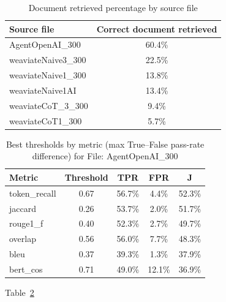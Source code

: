 \begin{table}[htbp]
    \centering
    \begin{tabular}{l c}
        \hline
        Source file & Correct document retrieved \\
        \hline
    AgentOpenAI\_300 & 60.4\% \\
    weaviateNaive3\_300 & 22.5\% \\
    weaviateNaive1\_300 & 13.8\% \\
    weaviateNaive1AI & 13.4\% \\
    weaviateCoT\_3\_300 & 9.4\% \\
    weaviateCoT1\_300 & 5.7\% \\
        \hline
    \end{tabular}
    \caption{Document retrieved percentage by source file}\label{tab:doc-retrieved-by-source}
\end{table}

\begin{table}[htbp]
  \centering
  \begin{tabular}{l c c c c}
    \hline
    Metric & Threshold & TPR & FPR & J \\
    \hline
    token\_recall & 0.67 & 56.7\% & 4.4\%  & 52.3\% \\
    jaccard       & 0.26 & 53.7\% & 2.0\%  & 51.7\% \\
    rouge1\_f     & 0.40 & 52.3\% & 2.7\%  & 49.7\% \\
    overlap       & 0.56 & 56.0\% & 7.7\%  & 48.3\% \\
    bleu          & 0.37 & 39.3\% & 1.3\%  & 37.9\% \\
    bert\_cos     & 0.71 & 49.0\% & 12.1\% & 36.9\% \\
    \hline
  \end{tabular}
    \caption{Best thresholds by metric (max True--False pass-rate difference) for File: AgentOpenAI\_300}\label{tab:agentopenai300-best-thresholds}
\end{table}

Table~\ref{tab:agentopenai300-best-thresholds}

